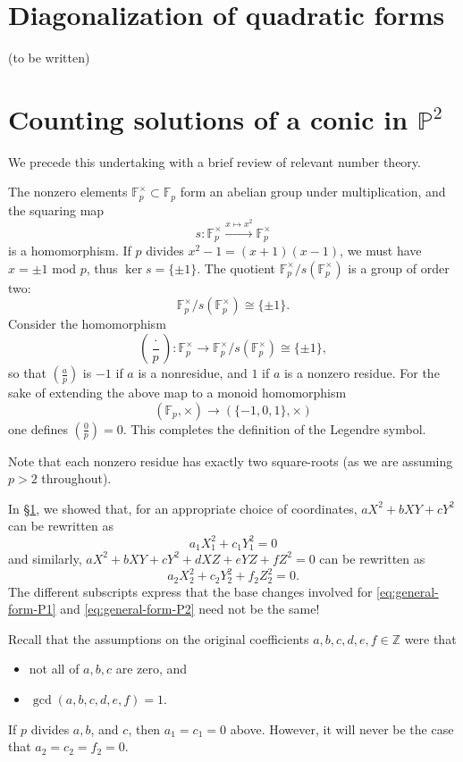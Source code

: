 \documentclass[10pt,a4paper]{amsart}
\numberwithin{equation}{section}
\numberwithin{figure}{section}
\theoremstyle{definition}
\theoremstyle{remark}
\theoremstyle{plain}
\theoremstyle{plain}
\theoremstyle{definition}
\theoremstyle{plain}
\theoremstyle{plain}
\newcommand{\legendre}[2]{\genfrac{(}{)}{}{}{#1}{#2}}
\renewcommand{\P}{\mathbb{P}}
\newcommand{\F}{\mathbb{F}}
\begin{document}
\section{Diagonalization of quadratic forms}\label{sec:diagonalizing-quadratic-forms}
(to be written)

\section{Counting solutions of a conic in $\P^2$}
We precede this undertaking with a brief review of relevant number theory.

The nonzero elements $\mathbb{F}^\times_p \subset \mathbb{F}_p$ form an abelian group under multiplication, and the squaring map
\[
s\colon \mathbb{F}^\times_p \xrightarrow{x \mapsto x^2} \mathbb{F}^\times_p
\]
is a homomorphism. If $p$ divides $x^2 - 1 = (x+1)(x-1)$, we must have $x = \pm 1$ mod $p$, thus $\ker s = \{\pm 1\}$. The quotient $\mathbb{F}^\times_p / s(\F_p^\times)$ is a group of order two:
\[
\mathbb{F}^\times_p / s(\F_p^\times) \cong \{\pm 1\}.
\]
Consider the homomorphism
\[
	\legendre{\cdot}{p}\colon \F_p^\times \to \F_p^\times / s(\F_p^\times) \cong \{\pm 1\},
\]
so that $\legendre{a}{p}$ is $-1$ if $a$ is a nonresidue, and $1$ if $a$ is a nonzero residue. For the sake of extending the above map to a monoid homomorphism
\[
	(\F_p,\times) \to (\{-1,0,1\}, \times)
\]
one defines $\legendre{0}{p} = 0$. This completes the definition of the Legendre symbol.

Note that each nonzero residue has exactly two square-roots (as we are assuming $p > 2$ throughout).

In \S\ref{sec:diagonalizing-quadratic-forms}, we showed that, for an appropriate choice of coordinates, $aX^2 + bXY + cY^2$ can be rewritten as
\begin{equation}\label{eq:general-form-P1}
	a_1 X_1^2 + c_1 Y_1^2 = 0
\end{equation}
and similarly, $aX^2 + bXY + cY^2 + dXZ + eYZ + fZ^2 = 0$ can be rewritten as
\begin{equation}\label{eq:general-form-P2}
	a_2 X_2^2 + c_2 Y_2^2 + f_2 Z_2^2 = 0.
\end{equation}
The different subscripts express that the base changes involved for \eqref{eq:general-form-P1} and \eqref{eq:general-form-P2} need not be the same!

Recall that the assumptions on the original coefficients $a,b,c,d,e,f \in \mathbb{Z}$ were that
\begin{itemize}
	\item not all of $a,b,c$ are zero, and
	\item $\gcd(a,b,c,d,e,f) = 1$.
\end{itemize}
If $p$ divides $a,b$, and $c$, then $a_1 = c_1 = 0$ above. However, it will never be the case that $a_2 = c_2 = f_2 = 0$.
\end{document}
